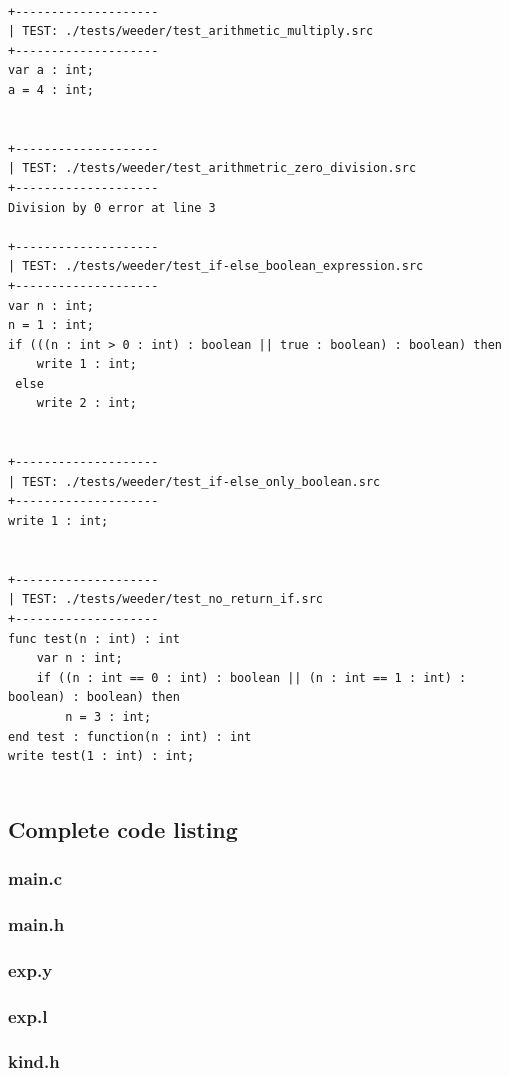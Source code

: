 \documentclass[a4paper,10pt,titlepage]{report}
\begin{document}
\begin{lstlisting}
 
+--------------------
| TEST: ./tests/weeder/test_arithmetic_multiply.src
+--------------------
var a : int;
a = 4 : int;

 
+--------------------
| TEST: ./tests/weeder/test_arithmetric_zero_division.src
+--------------------
Division by 0 error at line 3
 
+--------------------
| TEST: ./tests/weeder/test_if-else_boolean_expression.src
+--------------------
var n : int;
n = 1 : int;
if (((n : int > 0 : int) : boolean || true : boolean) : boolean) then
    write 1 : int;
 else
    write 2 : int;

 
+--------------------
| TEST: ./tests/weeder/test_if-else_only_boolean.src
+--------------------
write 1 : int;

 
+--------------------
| TEST: ./tests/weeder/test_no_return_if.src
+--------------------
func test(n : int) : int
    var n : int;
    if ((n : int == 0 : int) : boolean || (n : int == 1 : int) : boolean) : boolean) then
        n = 3 : int;
end test : function(n : int) : int
write test(1 : int) : int;


\end{lstlisting}

\subsection{Complete code listing}
\subsubsection{main.c}


\subsubsection{main.h}


\subsubsection{exp.y}


\subsubsection{exp.l}


\subsubsection{kind.h}

\end{document}
